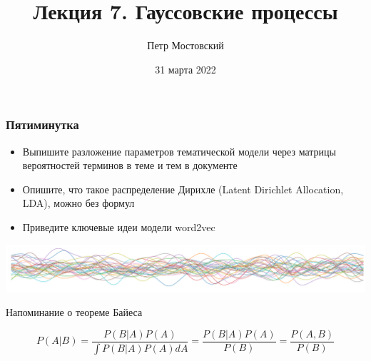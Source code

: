 \documentclass[fullscreen=true, bookmarks=true, hyperref={pdfencoding=unicode}]{beamer}
\title{Лекция 7. Гауссовские процессы}
\author{Петр Мостовский}
\institute{МКН СПбГУ}
\date{31 марта 2022}
\begin{document}

\begin{frame}
    \transdissolve[duration=0.2]
    \titlepage
\end{frame}


\begin{frame}
  \frametitle{Пятиминутка}
  \begin{itemize}
    \item Выпишите разложение параметров тематической модели через матрицы вероятностей терминов в теме и тем в документе
    \item Опишите, что такое распределение Дирихле (Latent Dirichlet Allocation, LDA), можно без формул
    \item Приведите ключевые идеи модели word2vec
  \end{itemize}
\end{frame}


\begin{frame}{}

    \centerline{\includegraphics[]{logo-samples.pdf}}

\end{frame}


\begin{frame}{Напоминание о теореме Байеса}

    $$ P(A | B) = \frac{P(B | A) P(A)}{\int P(B | A) P(A) dA} = \frac{P(B | A) P(A)}{P(B)} = \frac{P(A, B)}{P(B)} $$

\end{frame}
\end{document}
